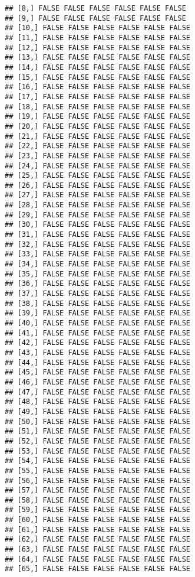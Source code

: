 \documentclass[
]{article}
\begin{document}
\begin{verbatim}
## [8,] FALSE FALSE FALSE FALSE FALSE FALSE
## [9,] FALSE FALSE FALSE FALSE FALSE FALSE
## [10,] FALSE FALSE FALSE FALSE FALSE FALSE
## [11,] FALSE FALSE FALSE FALSE FALSE FALSE
## [12,] FALSE FALSE FALSE FALSE FALSE FALSE
## [13,] FALSE FALSE FALSE FALSE FALSE FALSE
## [14,] FALSE FALSE FALSE FALSE FALSE FALSE
## [15,] FALSE FALSE FALSE FALSE FALSE FALSE
## [16,] FALSE FALSE FALSE FALSE FALSE FALSE
## [17,] FALSE FALSE FALSE FALSE FALSE FALSE
## [18,] FALSE FALSE FALSE FALSE FALSE FALSE
## [19,] FALSE FALSE FALSE FALSE FALSE FALSE
## [20,] FALSE FALSE FALSE FALSE FALSE FALSE
## [21,] FALSE FALSE FALSE FALSE FALSE FALSE
## [22,] FALSE FALSE FALSE FALSE FALSE FALSE
## [23,] FALSE FALSE FALSE FALSE FALSE FALSE
## [24,] FALSE FALSE FALSE FALSE FALSE FALSE
## [25,] FALSE FALSE FALSE FALSE FALSE FALSE
## [26,] FALSE FALSE FALSE FALSE FALSE FALSE
## [27,] FALSE FALSE FALSE FALSE FALSE FALSE
## [28,] FALSE FALSE FALSE FALSE FALSE FALSE
## [29,] FALSE FALSE FALSE FALSE FALSE FALSE
## [30,] FALSE FALSE FALSE FALSE FALSE FALSE
## [31,] FALSE FALSE FALSE FALSE FALSE FALSE
## [32,] FALSE FALSE FALSE FALSE FALSE FALSE
## [33,] FALSE FALSE FALSE FALSE FALSE FALSE
## [34,] FALSE FALSE FALSE FALSE FALSE FALSE
## [35,] FALSE FALSE FALSE FALSE FALSE FALSE
## [36,] FALSE FALSE FALSE FALSE FALSE FALSE
## [37,] FALSE FALSE FALSE FALSE FALSE FALSE
## [38,] FALSE FALSE FALSE FALSE FALSE FALSE
## [39,] FALSE FALSE FALSE FALSE FALSE FALSE
## [40,] FALSE FALSE FALSE FALSE FALSE FALSE
## [41,] FALSE FALSE FALSE FALSE FALSE FALSE
## [42,] FALSE FALSE FALSE FALSE FALSE FALSE
## [43,] FALSE FALSE FALSE FALSE FALSE FALSE
## [44,] FALSE FALSE FALSE FALSE FALSE FALSE
## [45,] FALSE FALSE FALSE FALSE FALSE FALSE
## [46,] FALSE FALSE FALSE FALSE FALSE FALSE
## [47,] FALSE FALSE FALSE FALSE FALSE FALSE
## [48,] FALSE FALSE FALSE FALSE FALSE FALSE
## [49,] FALSE FALSE FALSE FALSE FALSE FALSE
## [50,] FALSE FALSE FALSE FALSE FALSE FALSE
## [51,] FALSE FALSE FALSE FALSE FALSE FALSE
## [52,] FALSE FALSE FALSE FALSE FALSE FALSE
## [53,] FALSE FALSE FALSE FALSE FALSE FALSE
## [54,] FALSE FALSE FALSE FALSE FALSE FALSE
## [55,] FALSE FALSE FALSE FALSE FALSE FALSE
## [56,] FALSE FALSE FALSE FALSE FALSE FALSE
## [57,] FALSE FALSE FALSE FALSE FALSE FALSE
## [58,] FALSE FALSE FALSE FALSE FALSE FALSE
## [59,] FALSE FALSE FALSE FALSE FALSE FALSE
## [60,] FALSE FALSE FALSE FALSE FALSE FALSE
## [61,] FALSE FALSE FALSE FALSE FALSE FALSE
## [62,] FALSE FALSE FALSE FALSE FALSE FALSE
## [63,] FALSE FALSE FALSE FALSE FALSE FALSE
## [64,] FALSE FALSE FALSE FALSE FALSE FALSE
## [65,] FALSE FALSE FALSE FALSE FALSE FALSE

\end{verbatim}
\end{document}
